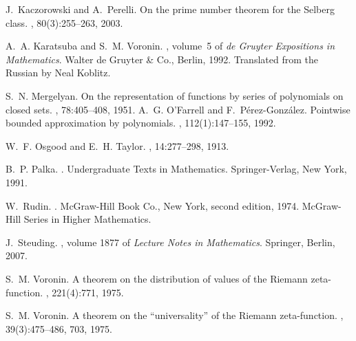 \documentclass[11pt]{article}
\begin{document}
\begin{thebibliography}{21}
J.~Kaczorowski and A.~Perelli.
\newblock On the prime number theorem for the {S}elberg class.
, 80(3):255--263, 2003.

A.~A. Karatsuba and S.~M. Voronin.
, volume~5 of {\em de Gruyter
  Expositions in Mathematics}.
\newblock Walter de Gruyter \& Co., Berlin, 1992.
\newblock Translated from the Russian by Neal Koblitz.

S.~N. Mergelyan.
\newblock On the representation of functions by series of polynomials on closed
  sets.
, 78:405--408, 1951.
A.~G. O'Farrell and F.~P{\'e}rez-Gonz{\'a}lez.
\newblock Pointwise bounded approximation by polynomials.
, 112(1):147--155, 1992.

W.~F. Osgood and E.~H. Taylor.
, 14:277--298, 1913.

B.~P. Palka.
.
\newblock Undergraduate Texts in Mathematics. Springer-Verlag, New York, 1991.

W.~Rudin.
.
\newblock McGraw-Hill Book Co., New York, second edition, 1974.
\newblock McGraw-Hill Series in Higher Mathematics.

J.~Steuding.
, volume 1877 of {\em
  Lecture Notes in Mathematics}.
\newblock Springer, Berlin, 2007.

S.~M. Voronin.
\newblock A theorem on the distribution of values of the {R}iemann
  zeta-function.
, 221(4):771, 1975.

S.~M. Voronin.
\newblock A theorem on the ``universality'' of the {R}iemann zeta-function.
, 39(3):475--486, 703, 1975.

\end{thebibliography}
\end{document}

